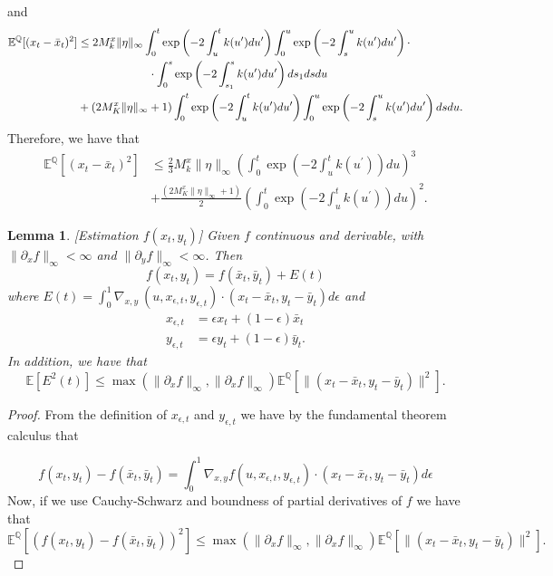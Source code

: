 \documentclass[a4paper,10pt]{article}
\newtheorem{lemma}[theorem]{Lemma}
\newcommand{\1}{\mathbf{1}}
\begin{document}
and
\begin{align*}
\mathbb{E}^{\mathbb{Q}}[(x_t - \bar{x}_t)^{2}] &\leq 2 M^{x}_k \|\eta\|_{\infty} \int_{0}^{t} \exp\left(- 2\int_{u}^{t} k(u^{\prime}) du^{\prime}\right)\int_{0}^{u} \exp\left(- 2\int_{s}^{u} k(u^{\prime}) du^{\prime}\right) \cdot \\
& \qquad \hspace{1.5cm} \cdot \int_{0}^{s}  \exp\left(- 2\int_{s_1}^{s} k(u^{\prime}) du^{\prime}\right) ds_1 ds du \\
&+ (2 M^{x}_K \|\eta\|_{\infty} + 1) \int_{0}^{t}  \exp\left(- 2\int_{u}^{t} k(u^{\prime}) du^{\prime}\right)  \int_{0}^{u} \exp\left(- 2\int_{s}^{u} k(u^{\prime}) du^{\prime}\right) ds du.
\end{align*}
Therefore, we have that
\begin{align*}
\mathbb{E}^{\mathbb{Q}}[(x_t - \bar{x}_t)^{2}] &\leq \frac{2}{3} M^{x}_k \|\eta\|_{\infty} \left( \int_{0}^{t} \exp\left(- 2\int_{u}^{t} k(u^{\prime}) \right) du  \right)^{3}  \\
&+ \frac{(2 M^{x}_K \|\eta\|_{\infty} + 1)}{2} \left( \int_{0}^{t}  \exp\left(- 2\int_{u}^{t} k(u^{\prime}) \right) du  \right)^{2}.
\end{align*}
\begin{lemma}\label{f_x_y}[Estimation $f(x_t,y_t)$] Given $f$ continuous and derivable, with $\|\partial_x f\|_{\infty} <\infty$ and $\|\partial_y f\|_{\infty}<\infty$. Then
\begin{equation*}
f(x_t,y_t)=f(\bar{x}_t,\bar{y}_t) + E(t)
\end{equation*}
where $E(t)=\int_{0}^{1} \nabla_{x,y}\ (u, x_{\epsilon,t}, y_{\epsilon,t}) \cdot (x_t - \bar{x}_t,y_t - \bar{y}_t) d\epsilon$ and
\begin{align*}
x_{\epsilon,t} &= \epsilon x_t + (1-\epsilon) \bar{x}_t \\
y_{\epsilon,t} &= \epsilon y_t + (1-\epsilon) \bar{y}_t.
\end{align*}
In addition, we have that 
\begin{equation*}
\mathbb{E}[E^{2}(t)] \leq \max(\|\partial_x f\|_{\infty}, \|\partial_x f\|_{\infty}) \mathbb{E}^{\mathbb{Q}}[\|(x_t - \bar{x}_t,y_t - \bar{y}_t)\|^{2}].
\end{equation*}
\end{lemma}
\begin{proof}
From the definition of $x_{\epsilon,t}$ and $y_{\epsilon,t}$ we have by the fundamental theorem calculus that

\begin{equation*}
f(x_t,y_t) - f(\bar{x}_t,\bar{y}_t) = \int_{0}^{1} \nabla_{x,y}f (u, x_{\epsilon,t}, y_{\epsilon,t})\cdot (x_t - \bar{x}_t,y_t - \bar{y}_t) d\epsilon
\end{equation*}
Now, if we use Cauchy-Schwarz and boundness of partial derivatives of $f$ we have that
\begin{equation*}
\mathbb{E}^{\mathbb{Q}}[(f(x_t,y_t) - f(\bar{x}_t,\bar{y}_t))^{2}] \leq \max(\|\partial_x f\|_{\infty}, \|\partial_x f\|_{\infty}) \mathbb{E}^{\mathbb{Q}}[\|(x_t - \bar{x}_t,y_t - \bar{y}_t)\|^{2}].
\end{equation*}

\end{proof}
\end{document}
